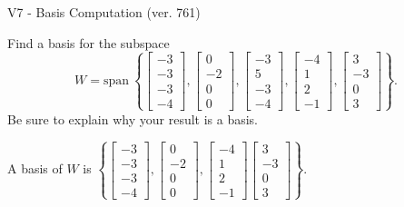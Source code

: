 \begin{exercise}
  \begin{exerciseTitle}V7 - Basis Computation (ver. 761)\end{exerciseTitle}
  \begin{exerciseStatement}
    Find a basis for the subspace 
\[W=\mathrm{span}\ \left\{\left[\begin{array}{r}
-3 \\
-3 \\
-3 \\
-4
\end{array}\right] , \left[\begin{array}{r}
0 \\
-2 \\
0 \\
0
\end{array}\right] , \left[\begin{array}{r}
-3 \\
5 \\
-3 \\
-4
\end{array}\right] , \left[\begin{array}{r}
-4 \\
1 \\
2 \\
-1
\end{array}\right] , \left[\begin{array}{r}
3 \\
-3 \\
0 \\
3
\end{array}\right]\right\}.\]
 Be sure to explain why your result is a basis.


  \end{exerciseStatement}
  \begin{exerciseAnswer}
   A basis of \(W\) is  \(\left\{\left[\begin{array}{r}
-3 \\
-3 \\
-3 \\
-4
\end{array}\right] , \left[\begin{array}{r}
0 \\
-2 \\
0 \\
0
\end{array}\right] , \left[\begin{array}{r}
-4 \\
1 \\
2 \\
-1
\end{array}\right] \left[\begin{array}{r}
3 \\
-3 \\
0 \\
3
\end{array}\right]\right\}\).
  


  \end{exerciseAnswer}
\end{exercise}